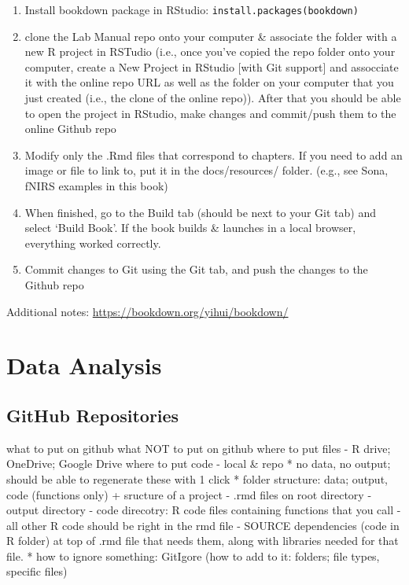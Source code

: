 \documentclass[
]{book}
\begin{document}
\begin{enumerate}
\def\labelenumi{\arabic{enumi}.}
\item
  Install bookdown package in RStudio: \texttt{install.packages(\textquotesingle{}bookdown\textquotesingle{})}
\item
  clone the Lab Manual repo onto your computer \& associate the folder with a new R project in RSTudio (i.e., once you've copied the repo folder onto your computer, create a New Project in RStudio {[}with Git support{]} and assocciate it with the online repo URL as well as the folder on your computer that you just created (i.e., the clone of the online repo)). After that you should be able to open the project in RStudio, make changes and commit/push them to the online Github repo
\item
  Modify only the .Rmd files that correspond to chapters. If you need to add an image or file to link to, put it in the docs/resources/ folder. (e.g., see Sona, fNIRS examples in this book)
\item
  When finished, go to the Build tab (should be next to your Git tab) and select `Build Book'. If the book builds \& launches in a local browser, everything worked correctly.
\item
  Commit changes to Git using the Git tab, and push the changes to the Github repo
\end{enumerate}

Additional notes: \url{https://bookdown.org/yihui/bookdown/}

\hypertarget{intro}{%
\chapter{Data Analysis}\label{intro}}

\hypertarget{github-repositories}{%
\section{GitHub Repositories}\label{github-repositories}}

what to put on github
what NOT to put on github
where to put files - R drive; OneDrive; Google Drive
where to put code - local \& repo
* no data, no output; should be able to regenerate these with 1 click
* folder structure: data; output, code (functions only)
+ sructure of a project
- .rmd files on root directory
- output directory
- code direcotry: R code files containing functions that you call
- all other R code should be right in the rmd file
- SOURCE dependencies (code in R folder) at top of .rmd file that needs them, along with libraries needed for that file.
* how to ignore something: GitIgore (how to add to it: folders; file types, specific files)
\end{document}
